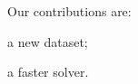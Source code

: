 \documentclass{article}
\begin{document}
Our contributions are:
\item a new dataset;
\item a faster solver.
\end{document}
